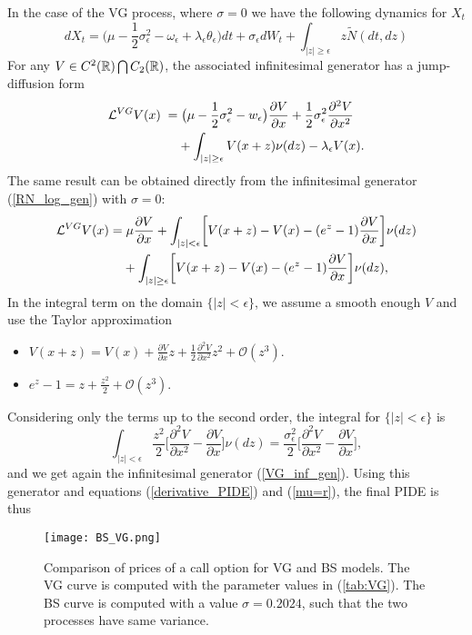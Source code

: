 In the case of the VG process, where $\sigma = 0$ we have the following dynamics for $X_t$
\begin{equation}\label{log_sde_VG}
dX_t = \biggl( \mu - \frac{1}{2} \sigma_{\epsilon}^2 - \omega_{\epsilon} + \lambda_{\epsilon} \theta_{\epsilon}  \biggr) dt 
       + \sigma_{\epsilon} dW_t + \int_{|z|\geq \epsilon} z \tilde N(dt,dz)
\end{equation}
For any $V\in C^2(\mathbb{R}) \bigcap C_2(\mathbb{R})$, the associated infinitesimal generator has a jump-diffusion form
\begin{align}\label{VG_inf_gen}
\mathcal{L}^{VG} V(x) \; =& \; \bigl( \mu-\frac{1}{2}\sigma_{\epsilon}^2 - w_{\epsilon} \bigr) \frac{\partial V}{\partial x} 
+ \frac{1}{2}\sigma_{\epsilon}^2 \frac{\partial^2 V}{\partial x^2} \\ \nonumber
&+ \int_{|z| \geq \epsilon} V(x+z) \nu(dz) - \lambda_{\epsilon} V(x).
\end{align}
The same result can be obtained directly from the infinitesimal generator (\ref{RN_log_gen}) with $\sigma =0$:
\begin{align*}
\mathcal{L}^{VG} V(x) =& \; \mu \frac{\partial V}{\partial x}
+ \int_{|z| < \epsilon}
\biggl[ V(x+z) - V(x) - (e^z-1)\frac{\partial V}{\partial x} \biggr] \nu(dz) \\
&+ \int_{|z| \geq \epsilon}
\biggl[ V(x+z) - V(x) - (e^z-1)\frac{\partial V}{\partial x} \biggr] \nu(dz),
\end{align*}
In the integral term on the domain $\{ |z|<\epsilon \}$, we assume a smooth enough $V$ and use the Taylor approximation
\begin{itemize}
 \item $V(x+z) = V(x) + \frac{\partial V}{\partial x} z + \frac{1}{2} \frac{\partial^2 V}{\partial x^2} z^2 + \mathcal{O}(z^3)$.
 \item $e^z-1 = z + \frac{z^2}{2} + \mathcal{O}(z^3) $.
\end{itemize}
Considering only the terms up to the second order, the integral for $\{ |z| < \epsilon \}$ is
\begin{equation*}
 \int_{|z| < \epsilon} \frac{z^2}{2}
\biggl[ \frac{\partial^2 V}{\partial x^2} - \frac{\partial V}{\partial x} \biggr] \nu(dz)
= \frac{\sigma_{\epsilon}^2}{2} \biggl[ \frac{\partial^2 V}{\partial x^2} - \frac{\partial V}{\partial x} \biggr],
\end{equation*}
and we get again the infinitesimal generator (\ref{VG_inf_gen}).
Using this generator and equations (\ref{derivative_PIDE}) and (\ref{mu=r}), the final PIDE is thus
\begin{figure}[!t]
   \centering
   \texttt{[image: BS\_VG.png]}
   \caption{Comparison of prices of a call option for VG and BS models. The VG curve is computed with the parameter values in (\ref{tab:VG}). The BS curve is computed with a 
   value $\sigma = 0.2024$, such that the two processes have same variance.}
   \label{BS_VG} 
 \end{figure}
